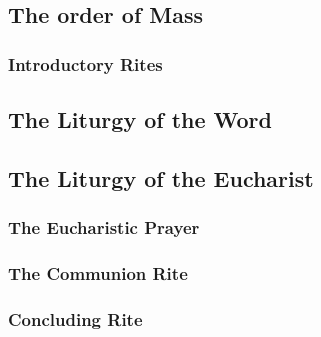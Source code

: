 \begin{english}
\chapter[The order of Mass][The order of Mass]{The order of Mass}
\subsection*{Introductory Rites}



\section[The Liturgy of the Word]{The Liturgy of the Word}

\section[The Liturgy of the Eucharist]{The Liturgy of the Eucharist}


\subsection*{The Eucharistic Prayer}


\subsection*{The Communion Rite}


\subsection*{Concluding Rite}

\end{english}


